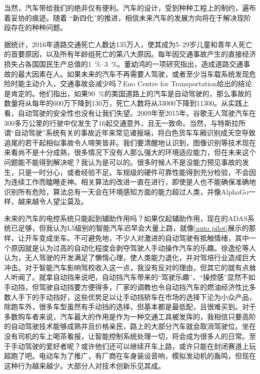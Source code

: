 \documentclass[UTF8]{ctexart}
\numberwithin{figure}{section}
\numberwithin{table}{section}
\begin{document}
当然，汽车带给我们的绝非仅有便利。汽车的设计，受到种种工程上的制约，遍布着妥协的痕迹。随着 “新四化”的推进，相信未来汽车的发展方向将在于解决现阶段存在的种种问题。

据统计，2016年道路交通死亡人数达135万人，使其成为\numrange[range-phrase = $\,\sim\,$]{5}{29}岁儿童和青年人死亡的首要原因，以及所有年龄组死亡的第八大原因。每年因交通事故产生的直接经济损失占各国国民生产总值的\qtyrange[range-phrase = $\,\sim\,$, range-units = single]{1}{3}{\percent}。董幼鸿的一项研究指出，造成道路交通事故的最大因素在人。如果未来的汽车不再需要人驾驶，或者至少当车载系统发现危险时能主动介入，交通事故会减少吗？Eno Centre for Transportation给出的结论是肯定的。他们指出，如果\SI{90}{\percent}的美国道路上的汽车是自动驾驶的，那么事故的数量将从每年的600万下降到130万，死亡人数将从\num[group-separator={,}]{33000}下降到\num[group-separator={,}]{11300}。从实践上看，自动驾驶的安全性也没有让我们失望。2009年至2015年，谷歌无人驾驶汽车在300多万公里的行驶中仅发生了16起交通意外，且无一致命。当然，与特斯拉所谓“自动驾驶”系统有关的事故近年来常见诸报端，将白色货车车厢识别成天空导致追尾的若干起相似事故令人啼笑皆非。我们要清醒地认识到，图像识别等技术现在来看尚不是十分成熟，很多情况下没有人那么强大的环境适应能力，但在未来这个问题能不能得到解决呢？我认为是可以的。很多时候人不是没能力预见事故的发生，只是一时分心，或者经验不足。车规级的硬件可靠性能得到充分检验，不会因为连续工作而瞌睡走神。相关算法的改进一直在进行，即使是人也不能确保准确地识别所有危险，算法总有一天会在环境感知方面的能力超过人类，并像AlphaGo一样，越来越令人望尘莫及。

未来的汽车的电控系统只能起到辅助作用吗？如果仅起辅助作用，现在的ADAS系统已足够，但我认为L5级别的智能汽车迟早会大量上路，就像\cref{auto pilot}展示的那样，让开车变成坐车。不可避免地，不少人对激进的自动驾驶有抵触情绪，其中一个原因就是认为过高的自动化程度会剥夺驾驶人手动操作汽车的乐趣。徐逸伦等人认为，无人驾驶的开发满足了懒惰心理，使人类能力退化，并对驾培行业造成巨大冲击。对于智能汽车影响驾校收入这一点，我没有反对的理由，但其它的就有点耸人听闻了。就拿自动挡来说吧，自动挡汽车带来的“驾驶乐趣”、“操控感”显然不如手动挡，但驾驶自动挡要方便得多，厂家的调教也令自动挡汽车的燃油经济性比多数人手下的手动挡好，这些优势足以让手动挡轿车在市场的选择下沦为小众产品，除跑车外，很多车型虽然有手动挡的选择，但基本都是最低配，且很难买到。对于多数购车者来说，汽车最大的作用是作为一种交通工具被发挥的，我相信只要高阶的自动驾驶技术能够成熟并且价格亲民，路上的大部分汽车就会取消驾驶位。坐在没有司机的车上喝茶看报，让智能控制系统处理一切，将会成为很多人的日常。至于手动驾驶的爱好者呢？或许他们还可以继续开车上路，或许只能在封闭赛道上玩超跑了吧。电动车为了推广，有厂商在车身装设音响，模拟发动机的轰鸣，但现在这种行为越来越少。大部分人对技术创新乐见其成。
\end{document}
